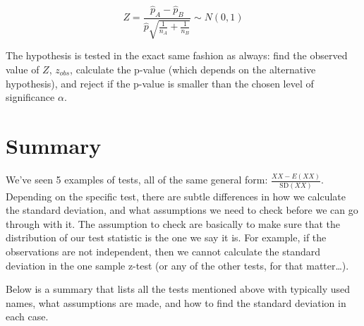 \documentclass[]{book}
\theoremstyle{definition}
\theoremstyle{definition}
\theoremstyle{definition}
\theoremstyle{remark}
\begin{document}
\[
  Z = \frac{\hat{p}_A - \hat{p}_B}{\hat{p}\sqrt{\frac{1}{n_A} + \frac{1}{n_B}}} \sim N(0,1)
\]

The hypothesis is tested in the exact same fashion as always: find the observed value of \(Z\), \(z_{obs}\), calculate the p-value (which depends on the alternative hypothesis), and reject if the p-value is smaller than the chosen level of significance \(\alpha\).

\hypertarget{summary}{%
\section{Summary}\label{summary}}

We've seen 5 examples of tests, all of the same general form: \(\frac{XX - E(XX)}{\text{SD}(XX)}\). Depending on the specific test, there are subtle differences in how we calculate the standard deviation, and what assumptions we need to check before we can go through with it. The assumption to check are basically to make sure that the distribution of our test statistic is the one we say it is. For example, if the observations are not independent, then we cannot calculate the standard deviation in the one sample z-test (or any of the other tests, for that matter\ldots).

Below is a summary that lists all the tests mentioned above with typically used names, what assumptions are made, and how to find the standard deviation in each case.
\end{document}
